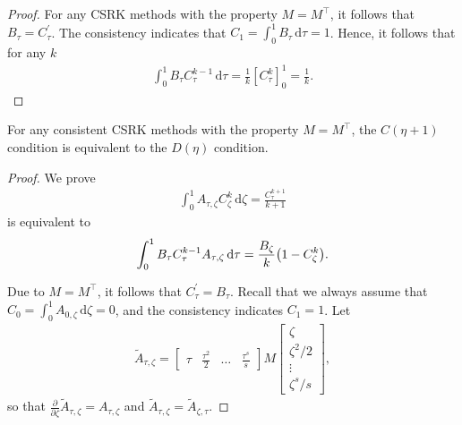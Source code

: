 \documentclass[final,leqno,onefignum,onetabnum]{siamltex1213}
\DeclarePairedDelimiter\paren{\lparen}{\rparen}
\begin{document}
\begin{proof}
For any CSRK methods with the property $M=M^\top$, it follows that$B_\tau=C_\tau^\prime$.
The consistency indicates that 
$C_1 = \int_0^1 B_\tau \,{\mathrm d}\tau=1$.
Hence, it follows that for any $k$
\begin{align*}
\int_0^1 B_\tau C_\tau^{k-1}\,{\mathrm d}\tau =
\frac{1}{k}\left[ C_\tau^k \right]_0^1 = \frac{1}{k}.
\end{align*} 
\end{proof}

\begin{theorem}
For any consistent CSRK methods with the property $M=M^\top$,
the $C(\eta+1)$ condition is equivalent to the $D(\eta)$ condition.
\end{theorem}

\begin{proof}
We prove
\begin{align}
\int_0^1 A_{\tau,\zeta} C_\zeta^k \,{\mathrm d}\zeta= \frac{C_\tau^{k+1}}{k+1}
 \label{eq:Ck1}
\end{align}
is equivalent to
\begin{align}
\int_0^1 B_\tau C_\tau^{k-1} A_{\tau,\zeta} \,{\mathrm d}\tau
=\frac{B_\zeta}{k} \paren*{1-C_\zeta^k}.
\label{eq:Dk}
\end{align}

Due to $M=M^\top$, it follows that $C_\tau^\prime=B_\tau$.
Recall that we always assume that $C_0 = \int_0^1 A_{0,\zeta}\,{\mathrm d}\zeta=0$,
and the consistency indicates $C_1=1$.
Let
\begin{align*}
\tilde{A}_{\tau,\zeta} = 
\begin{bmatrix}
\tau & \frac{\tau^2}{2} & \dots & \frac{\tau^s}{s}
\end{bmatrix}
M
\begin{bmatrix}
\zeta \\ \zeta^2/2 \\ \vdots \\ \zeta^s/s
\end{bmatrix},
\end{align*}
so that $\frac{\partial}{\partial \zeta} \tilde{A}_{\tau,\zeta} = A_{\tau,\zeta}$
and
$\tilde{A}_{\tau,\zeta} = \tilde{A}_{\zeta,\tau}$.


\end{proof}
\end{document}
